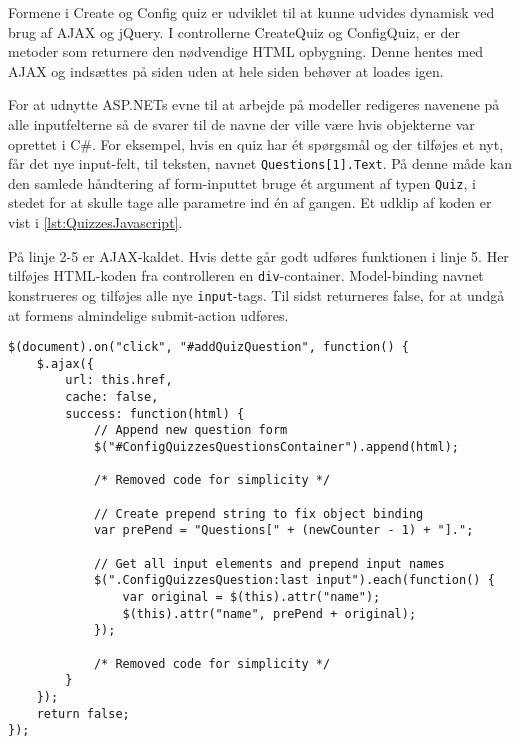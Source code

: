 Formene i Create og Config quiz er udviklet til at kunne udvides dynamisk ved brug af AJAX og jQuery. I controllerne CreateQuiz og ConfigQuiz, er der metoder som returnere den nødvendige HTML opbygning. Denne hentes med AJAX og indsættes på siden uden at hele siden behøver at loades igen.

For at udnytte ASP.NETs evne til at arbejde på modeller redigeres navenene på alle inputfelterne så de svarer til de navne der ville være hvis objekterne var oprettet i C\#.
For eksempel, hvis en quiz har ét spørgsmål og der tilføjes et nyt, får det nye input-felt, til teksten, navnet \verb+Questions[1].Text+.
På denne måde kan den samlede håndtering af form-inputtet bruge ét argument af typen \verb+Quiz+, i stedet for at skulle tage alle parametre ind én af gangen. Et udklip af koden er vist i \lstlistingname \ref{lst:QuizzesJavascript}.

På linje 2-5 er AJAX-kaldet. Hvis dette går godt udføres funktionen i linje 5. Her tilføjes HTML-koden fra controlleren en \verb+div+-container. Model-binding navnet konstrueres og tilføjes alle nye \verb+input+-tags. Til sidst returneres false, for at undgå at formens almindelige submit-action udføres.

\begin{lstlisting}[caption=JavaScript udklip til AJAX og model-binding håndtering ved indsættelse af nye spørgsmål, label=lst:QuizzesJavascript]
$(document).on("click", "#addQuizQuestion", function() {
    $.ajax({
        url: this.href,
        cache: false,
        success: function(html) {
            // Append new question form
            $("#ConfigQuizzesQuestionsContainer").append(html);

            /* Removed code for simplicity */
			
            // Create prepend string to fix object binding
            var prePend = "Questions[" + (newCounter - 1) + "].";

            // Get all input elements and prepend input names
            $(".ConfigQuizzesQuestion:last input").each(function() {
                var original = $(this).attr("name");
                $(this).attr("name", prePend + original);
            });
            
            /* Removed code for simplicity */
        }
    });
    return false;
});
\end{lstlisting}